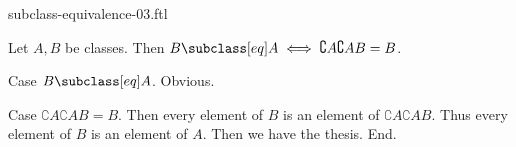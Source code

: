\documentclass{article}
\begin{document}
\begin{smodule}[creators={Marcel Schütz}]{subclass-equivalence-03.ftl}

  \begin{fproposition*}[label=1566063126904832]
    Let $A, B$ be classes.
    Then $B \subclass[eq] A \iff \complement{A}{\complement{A}{B}} = B$.
  \end{fproposition*}
  \begin{fproof}
    Case $B \subclass[eq] A$. Obvious.

    Case $\complement{A}{\complement{A}{B}} = B$.
      Then every element of $B$ is an element of $\complement{A}{\complement{A}{B}}$.
      Thus every element of $B$ is an element of $A$.
      Then we have the thesis.
    End.
  \end{fproof}
\end{smodule}
\end{document}
